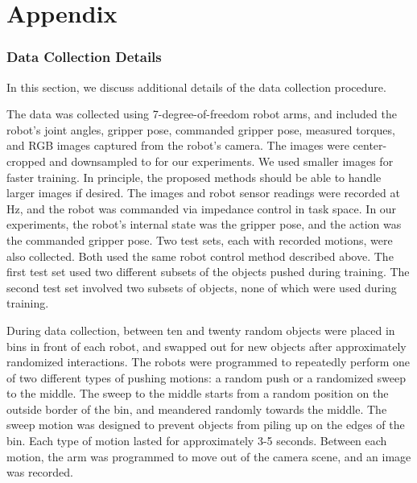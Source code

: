 \documentclass{article}
\begin{document}
\vspace{-0.1cm}
{\footnotesize


}



\newpage

\appendix
\part*{Appendix}

\section{Data Collection Details}
\label{app:robot}

In this section, we discuss additional details of the data collection procedure.

The data was collected using  7-degree-of-freedom robot arms, and included the robot's joint angles, gripper pose, commanded gripper pose, measured torques,
and  RGB images captured from the robot's camera.
The images were center-cropped and downsampled to  for our experiments. We used smaller images for faster training.
In principle, the proposed methods should be able to handle larger images if desired. The images and robot sensor readings were recorded at  Hz, and the robot was commanded via impedance control in task space. In our experiments, the robot's
internal state was the gripper pose, and the action was the commanded gripper pose. Two test sets, each with  recorded motions, were also collected.
Both used the same robot control method described above. The first test set used two different subsets of the objects pushed during training.
The second test set involved two subsets of objects, none of which were used during training.

During data collection, between ten and twenty random objects were placed in bins in front of each robot, and swapped out for new objects after approximately
 randomized interactions. The robots were
programmed to repeatedly perform one of two different types of pushing motions: a random push or a randomized sweep to the middle. The sweep to the middle starts from a random
position on the outside border of the bin, and meandered randomly towards the middle. The sweep motion was designed to prevent objects from piling up on the edges of the bin.
Each type of motion lasted for approximately 3-5 seconds.
Between each motion, the arm was programmed to move out of the camera scene, and an image was recorded.
\end{document}
